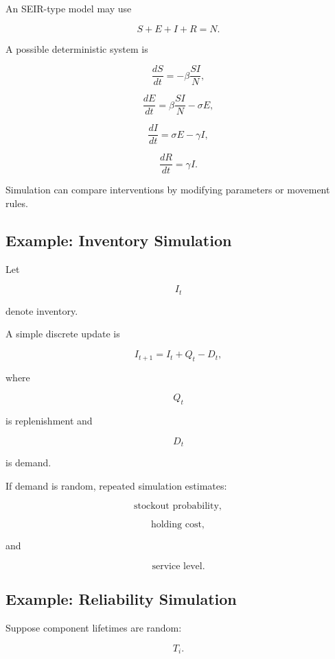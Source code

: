 An SEIR-type model may use

\[
\boxed{
S+E+I+R=N.
}
\]

A possible deterministic system is

\[
\boxed{
\frac{dS}{dt}
=
-\beta
\frac{SI}{N},
}
\]

\[
\boxed{
\frac{dE}{dt}
=
\beta
\frac{SI}{N}
-
\sigma E,
}
\]

\[
\boxed{
\frac{dI}{dt}
=
\sigma E
-
\gamma I,
}
\]

\[
\boxed{
\frac{dR}{dt}
=
\gamma I.
}
\]

Simulation can compare interventions by modifying parameters or movement
rules.

\subsection{Example: Inventory Simulation}
\label{subsec:inventory-simulation}

Let

\[
I_t
\]

denote inventory.

A simple discrete update is

\[
\boxed{
I_{t+1}
=
I_t
+
Q_t
-
D_t,
}
\]

where

\[
Q_t
\]

is replenishment and

\[
D_t
\]

is demand.

If demand is random, repeated simulation estimates:

\[
\boxed{
\text{stockout probability},
}
\]

\[
\boxed{
\text{holding cost},
}
\]

and

\[
\boxed{
\text{service level}.
}
\]

\subsection{Example: Reliability Simulation}
\label{subsec:reliability-simulation}

Suppose component lifetimes are random:

\[
\boxed{
T_i.
}
\]


